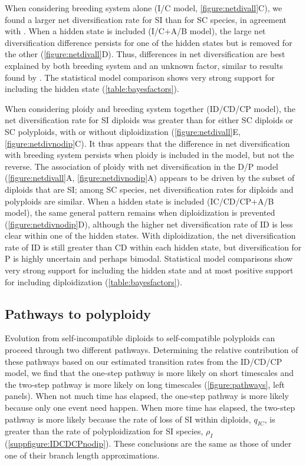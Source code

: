 When considering breeding system alone (I/C model, \cref{figure:netdivall}C), we found a larger net diversification rate for SI than for SC species, in agreement with \citet{goldberg_2010}. %
When a hidden state is included (I/C+A/B model), the large net diversification difference persists for one of the hidden states but is removed for the other (\cref{figure:netdivall}D).
Thus, differences in net diversification are best explained by both breeding system and an unknown factor, similar to results found by \citet{freyman_2018}.
The statistical model comparison shows very strong support for including the hidden state (\cref{table:bayesfactors}).

When considering ploidy and breeding system together (ID/CD/CP model), the net diversification rate for SI diploids was greater than for either SC diploids or SC polyploids, with or without diploidization (\cref{figure:netdivall}E, \cref{figure:netdivnodip}C).
It thus appears that the difference in net diversification with breeding system persists when ploidy is included in the model, but not the reverse.
The association of ploidy with net diversification in the D/P model (\cref{figure:netdivall}A, \cref{figure:netdivnodip}A) appears to be driven by the subset of diploids that are SI; among SC species, net diversification rates for diploids and polyploids are similar.
%
When a hidden state is included (IC/CD/CP+A/B model), the same general pattern remains when diploidization is prevented (\cref{figure:netdivnodip}D), although the higher net diversification rate of ID is less clear within one of the hidden states.
With diploidization, the net diversification rate of ID is still greater than CD within each hidden state, but diversification for P is highly uncertain and perhaps bimodal.
Statistical model comparisons show very strong support for including the hidden state and at most positive support for including diploidization (\cref{table:bayesfactors}).

\subsection{Pathways to polyploidy}

Evolution from self-incompatible diploids to self-compatible polyploids can proceed through two different pathways.
Determining the relative contribution of these pathways based on our estimated transition rates from the ID/CD/CP model, we find that the one-step pathway is more likely on short timescales and the two-step pathway is more likely on long timescales (\cref{figure:pathways}, left panels).
When not much time has elapsed, the one-step pathway is more likely because only one event need happen.
When more time has elapsed, the two-step pathway is more likely because the rate of loss of SI within diploids, $q_{IC}$, is greater than the rate of polyploidization for SI species, $\rho_I$ (\cref{suppfigure:IDCDCPnodip}).
These conclusions are the same as those of \citet{robertson_2011} under one of their branch length approximations.


